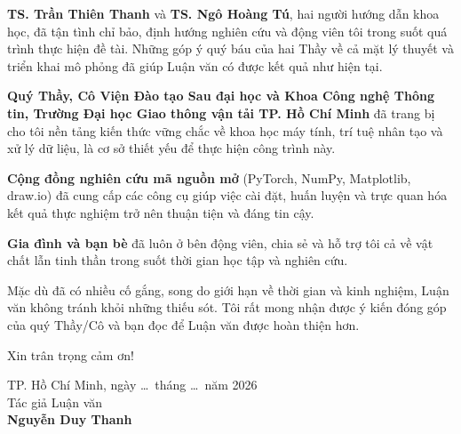 \vspace{0.3cm}
\hspace{1.27cm}\textbf{TS. Trần Thiên Thanh} và \textbf{TS. Ngô Hoàng Tú},
hai người hướng dẫn khoa học, đã tận tình chỉ bảo, định hướng nghiên cứu
và động viên tôi trong suốt quá trình thực hiện đề tài. Những góp ý quý
báu của hai Thầy về cả mặt lý thuyết và triển khai mô phỏng đã giúp Luận
văn có được kết quả như hiện tại.

\vspace{0.3cm}
\hspace{1.27cm}\textbf{Quý Thầy, Cô Viện Đào tạo Sau đại học và Khoa Công
nghệ Thông tin, Trường Đại học Giao thông vận tải TP. Hồ Chí Minh} đã
trang bị cho tôi nền tảng kiến thức vững chắc về khoa học máy tính, trí
tuệ nhân tạo và xử lý dữ liệu, là cơ sở thiết yếu để thực hiện công trình
này.

\vspace{0.3cm}
\hspace{1.27cm}\textbf{Cộng đồng nghiên cứu mã nguồn mở} (PyTorch, NumPy,
Matplotlib, draw.io) đã cung cấp các công cụ giúp việc cài đặt, huấn luyện
và trực quan hóa kết quả thực nghiệm trở nên thuận tiện và đáng tin cậy.

\vspace{0.3cm}
\hspace{1.27cm}\textbf{Gia đình và bạn bè} đã luôn ở bên động viên, chia sẻ và
hỗ trợ tôi cả về vật chất lẫn tinh thần trong suốt thời gian học tập và
nghiên cứu.

\vspace{0.5cm}
\hspace{1.27cm}Mặc dù đã có nhiều cố gắng, song do giới hạn về thời gian và
kinh nghiệm, Luận văn không tránh khỏi những thiếu sót. Tôi rất mong nhận
được ý kiến đóng góp của quý Thầy/Cô và bạn đọc để Luận văn được hoàn thiện
hơn.

\vspace{0.5cm}
\hspace{1.27cm}Xin trân trọng cảm ơn!

\vspace{1.5cm}
\begin{flushright}
\begin{minipage}{0.45\textwidth}
\centering
TP. Hồ Chí Minh, ngày \ldots\ tháng \ldots\ năm 2026\\[0.3cm]
Tác giả Luận văn\\[2.5cm]
\textbf{Nguyễn Duy Thanh}
\end{minipage}
\end{flushright}

